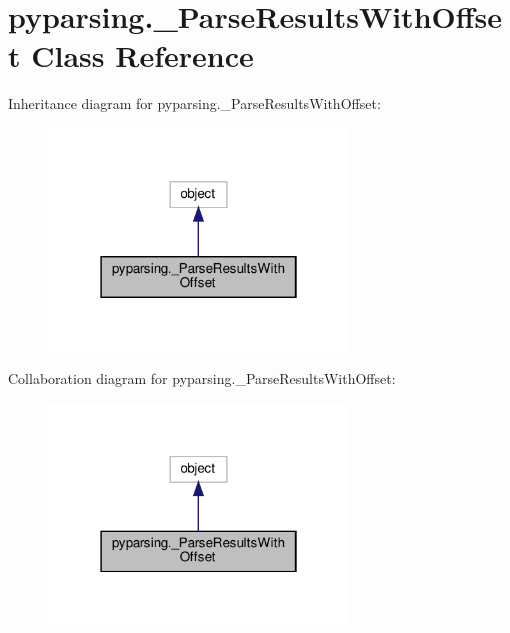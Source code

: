 \hypertarget{classpyparsing_1_1__ParseResultsWithOffset}{}\section{pyparsing.\+\_\+\+Parse\+Results\+With\+Offset Class Reference}
\label{classpyparsing_1_1__ParseResultsWithOffset}


Inheritance diagram for pyparsing.\+\_\+\+Parse\+Results\+With\+Offset\+:
\nopagebreak
\begin{figure}[H]
\begin{center}
\leavevmode
\includegraphics[width=226pt]{classpyparsing_1_1__ParseResultsWithOffset__inherit__graph}
\end{center}
\end{figure}


Collaboration diagram for pyparsing.\+\_\+\+Parse\+Results\+With\+Offset\+:
\nopagebreak
\begin{figure}[H]
\begin{center}
\leavevmode
\includegraphics[width=226pt]{classpyparsing_1_1__ParseResultsWithOffset__coll__graph}
\end{center}
\end{figure}
